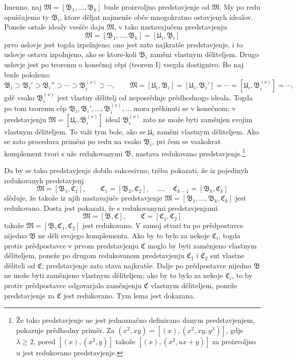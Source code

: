 \documentclass[11pt]{article}
\newcommand{\ideal}[1]{\mathfrak{#1}}
\begin{document}
Imenno, naj \(\ideal M=[\ideal B_1,\ldots,\ideal B_k]\) bude proizvoljno predstavjenje od \(\ideal M\). My po redu opuščajemo ty \(\ideal B_i\), ktore děljat najmenše obče mnogokratno ostavjenyh idealov. Poneže ostale idealy vsešče daju \(\ideal M\), v tako nastavajučem predstavjenju
\[
 \ideal M=[\ideal B_1,\ldots,\ideal B_k]=[\ideal U_i,\ideal B_i]
\]
prvo uslovje jest togda izpolnjeno; ono jest zato najkratše predstavjenje, i to uslovje ostava izpolnjeno, ako se ktore-koli \(\ideal B_i\) zaměni vlastnym děliteljem. Drugo uslovje jest po teoremu o konečnoj cěpi (teorem I) vsegda dostignivo. Bo naj bude položeno:
\[
 \ideal B_i\supset \ideal B_i'\supset \ideal B_i''\supset\cdots\supset \ideal B_i^{(\nu)}\supset\cdots,
 \qquad
 \ideal M=[\ideal U_i,\ideal B_i]=[\ideal U_i,\ideal B_i']=\cdots=[\ideal U_i,\ideal B_i^{(\nu)}]=\cdots,
\]
gdě vsako \(\ideal B_i^{(\nu)}\) jest vlastny dělitelj od neposrědnje prědhodnogo ideala. Togda po tom teoremu cěp \(\ideal B_i,\ideal B_i',\ldots,\ideal B_i^{(\nu)},\ldots\) mora prěkinuti se v konečnom; v predstavjenju \(\ideal M=[\ideal U_i,\ideal B_i^{(\nu)}]\) ideal \(\ideal B_i^{(\nu)}\) zato ne može byti zaměnjen svojim vlastnym děliteljem. To važi tym bole, ako se \(\ideal U_i\) zaměni vlastnym děliteljem. Ako se zato procedura priměni po redu na vsako \(\ideal B_i\), pri čem se vsakokrat komplement tvori s uže redukovanymi \(\ideal B\), nastava redukovano predstavjenje.\footnote{Že tako predstavjenje ne jest jednoznačno definirano danym predstavjenjem, pokazuje prědhodny priměr. Za \((x^2,xy)=[(x),(x^2,xy,y^\lambda)]\), gdje \(\lambda\ge2\), pored \([(x),(x^2,y)]\) takože \([(x),(x^2,ux+y)]\) za proizvoljno \(u\) jest redukovano predstavjenje.}

Da by se tako predstavjenje dobilo sukcesivno, trěba pokazati, že iz pojedinyh redukovanyh predstavjenj
\[
 \ideal M=[\ideal B_1,\ideal C_1],\qquad
 \ideal C_1=[\ideal B_2,\ideal C_2],\quad\ldots,\quad
 \ideal C_{k-1}=[\ideal B_k,\ideal C_k]
\]
slěduje, že takože iz njih nastavajuče predstavjenje \(\ideal M=[\ideal B_1,\ldots,\ideal B_k,\ideal C_k]\) jest redukovano. Dosta jest pokazati, že s redukovanymi predstavjenjami
\[
 \ideal M=[\ideal B,\ideal C],\qquad \ideal C=[\ideal C_1,\ideal C_2]
\]
takože \(\ideal M=[\ideal B,\ideal C_1,\ideal C_2]\) jest redukovano. V samoj stvari tu po prědpostavce nijedno \(\ideal B\) ne děli svojego komplementa. Ako by to bylo za nekoje \(\ideal C_i\), togda protiv prědpostavce v prvom predstavjenju \(\ideal C\) moglo by byti zaměnjeno vlastnym děliteljem, poneže po drugom redukovanom predstavjenju \(\ideal C_1\) i \(\ideal C_2\) sut vlastne děliteli od \(\ideal C\); predstavjenje zato stava najkratše. Dalje po prědpostavce nijedno \(\ideal B\) ne može byti zaměnjeno vlastnym děliteljem; ako by to bylo za nekoje \(\ideal C_i\), to by protiv prědpostavce odgovarjalo zaměnjenju \(\ideal C\) vlastnym děliteljem, poneže predstavjenje za \(\ideal C\) jest redukovano. Tym lema jest dokazana.
\end{document}
